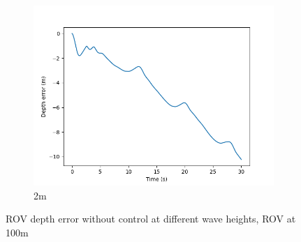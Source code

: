 \documentclass[class=article, crop=false]{standalone}
\begin{document}
\begin{figure}
\begin{subfigure}[b]{0.48\textwidth}
        \includegraphics{scenario1/rov-100m/2.0m/rov_depth_error_uncontrolled}
        \caption{2m}
        \label{}
    \end{subfigure}

    \caption{ROV depth error without control at different wave heights, ROV at 100m}
\end{figure}
\FloatBarrier
\end{document}
